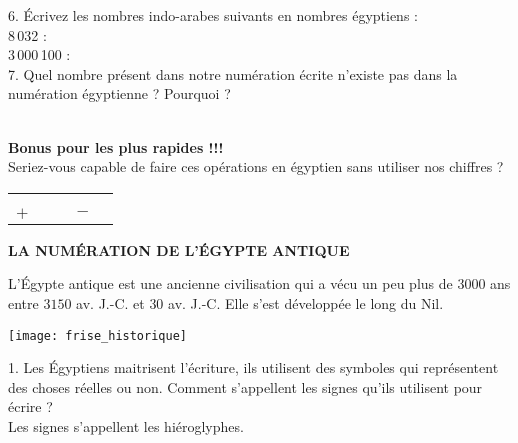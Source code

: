 \documentclass[12pt,a4paper]{article}
\begin{document}
   6. Écrivez les nombres indo-arabes suivants en nombres égyptiens : \\ [5mm]
   8\,032 :  \\ [5mm]
   3\,000\,100 :  \\ [3mm]
   
   7. Quel nombre présent dans notre numération écrite n'existe pas dans la numération égyptienne ? Pourquoi ? \\ [3mm]
   \mbox{} \\
   
\medskip

   {\bf Bonus pour les plus rapides !!!} \\
   Seriez-vous capable de faire ces opérations en égyptien sans utiliser nos chiffres ?
   \smallskip
   \begin{center}
      \begin{tabular}{crp{2cm}cr}
         & & & & \\
         &
      \Large\textpmhg{\Hmillion\Hhundred\Hhundred\Hhundred\Hten\Hone\Hone\Hone\Hone\Hone} & & &    \Large\textpmhg{\HXthousand\Hhundred\Hhundred\Hhundred\Hten\Hone\Hone\Hone\Hone\Hone}  \\
         $+$ & \Large\textpmhg{\HCthousand\Hthousand\Hthousand\Hhundred\Hten\Hten\Hone\Hone\Hone\Hone\Hone\Hone\Hone} & & $-$ & \Large\textpmhg{\Hhundred\Hhundred\Hten\Hten\Hone\Hone\Hone\Hone}  \\
         \cline{2-2} \cline{5-5}
      \end{tabular}
   \end{center}

\pagebreak
\thispagestyle{empty}

\begin{center}
   \bf LA NUMÉRATION DE L'ÉGYPTE ANTIQUE \\ [1cm]
\end{center}
   
\noindent L'Égypte antique est une ancienne civilisation qui a vécu un peu plus de $3000$ ans entre $3150$ av. J.-C. et $30$ av. J.-C. Elle s'est développée le long du Nil.

\begin{center}
   \texttt{[image: frise\_historique]}
\end{center}

1. Les Égyptiens maitrisent l'écriture, ils utilisent des symboles qui représentent des choses réelles ou non. Comment s'appellent les signes qu'ils utilisent pour écrire ? \\ [2mm]
   {\red Les signes s'appellent les hiéroglyphes.} \\ [3mm]
   
\end{document}
